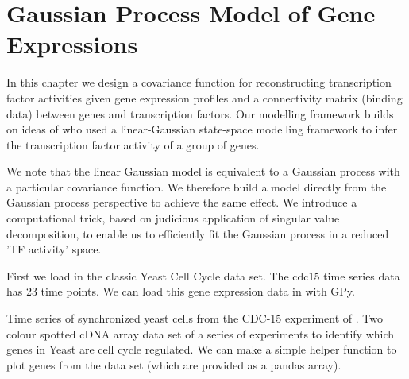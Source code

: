 
\chapter{Gaussian Process Model of Gene Expressions} %

\label{Chapter5} %



In this chapter we design a covariance function for reconstructing transcription factor activities given gene 
expression profiles and a connectivity matrix (binding data) between genes and transcription factors. 
Our modelling framework builds on ideas of \cite{Sanguinetti:2006} 
who used a linear-Gaussian state-space modelling framework to infer the transcription factor activity 
of a group of genes. 

We note that the linear Gaussian model is equivalent to a Gaussian process with a particular covariance function. 
We therefore build a model directly from the Gaussian process perspective to achieve the same effect. 
We introduce a computational trick, based on  judicious application of singular value decomposition, 
to enable us to efficiently fit the Gaussian process in a reduced 'TF activity' space. 


First we load in the classic \cite{Spellman:1998} Yeast Cell Cycle data set. The cdc15 time series data has 
23 time points. We can load this gene expression data in with GPy.

Time series of synchronized yeast cells from the CDC-15 experiment of \cite{Spellman:1998}. 
Two colour spotted cDNA array data set of a series of experiments to identify which genes in Yeast are 
cell cycle regulated.
We can make a simple helper function to plot genes from the data set (which are provided as a pandas array).

